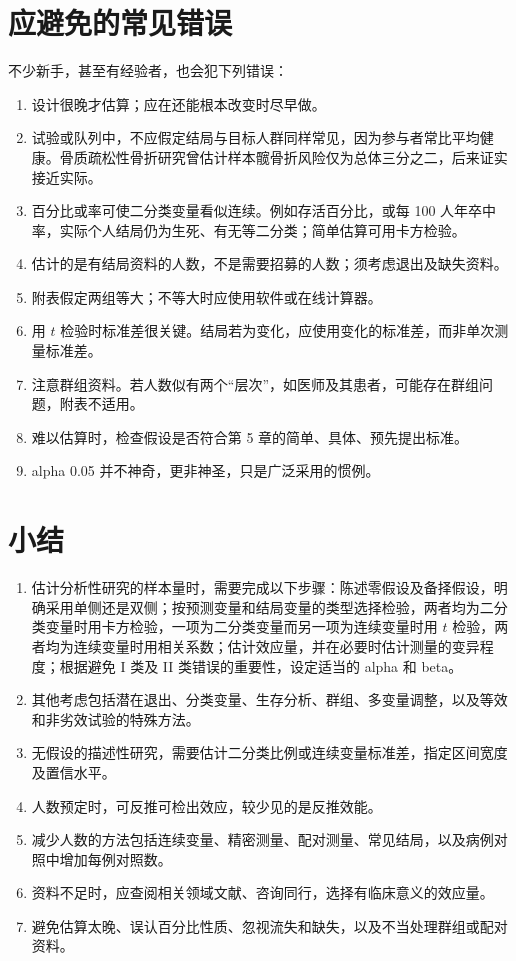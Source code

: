 \section{应避免的常见错误}
不少新手，甚至有经验者，也会犯下列错误：
\begin{enumerate}
\item 设计很晚才估算；应在还能根本改变时尽早做。
\item 试验或队列中，不应假定结局与目标人群同样常见，因为参与者常比平均健康。骨质疏松性骨折研究曾估计样本髋骨折风险仅为总体三分之二，后来证实接近实际。
\item 百分比或率可使二分类变量看似连续。例如存活百分比，或每 100 人年卒中率，实际个人结局仍为生死、有无等二分类；简单估算可用卡方检验。
\item 估计的是有结局资料的人数，不是需要招募的人数；须考虑退出及缺失资料。
\item 附表假定两组等大；不等大时应使用软件或在线计算器。
\item 用 $t$ 检验时标准差很关键。结局若为变化，应使用变化的标准差，而非单次测量标准差。
\item 注意群组资料。若人数似有两个“层次”，如医师及其患者，可能存在群组问题，附表不适用。
\item 难以估算时，检查假设是否符合第 5 章的简单、具体、预先提出标准。
\item alpha 0.05 并不神奇，更非神圣，只是广泛采用的惯例。
\end{enumerate}

\section{小结}
\begin{enumerate}
\item 估计分析性研究的样本量时，需要完成以下步骤：陈述零假设及备择假设，明确采用单侧还是双侧；按预测变量和结局变量的类型选择检验，两者均为二分类变量时用卡方检验，一项为二分类变量而另一项为连续变量时用 $t$ 检验，两者均为连续变量时用相关系数；估计效应量，并在必要时估计测量的变异程度；根据避免 I 类及 II 类错误的重要性，设定适当的 alpha 和 beta。
\item 其他考虑包括潜在退出、分类变量、生存分析、群组、多变量调整，以及等效和非劣效试验的特殊方法。
\item 无假设的描述性研究，需要估计二分类比例或连续变量标准差，指定区间宽度及置信水平。
\item 人数预定时，可反推可检出效应，较少见的是反推效能。
\item 减少人数的方法包括连续变量、精密测量、配对测量、常见结局，以及病例对照中增加每例对照数。
\item 资料不足时，应查阅相关领域文献、咨询同行，选择有临床意义的效应量。
\item 避免估算太晚、误认百分比性质、忽视流失和缺失，以及不当处理群组或配对资料。
\end{enumerate}


